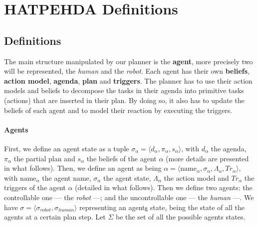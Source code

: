 \section{HATPEHDA Definitions}

\newcommand{\statespace}{S}
\newcommand{\worldstate}{s}
\newcommand{\agenth}{\alpha}
\newcommand{\agents}{Ag}
\newcommand{\agentstate}{\sigma}
\newcommand{\ctrlagents}{\widehat{Ag}}
\newcommand{\unctrlagents}{\widetilde{Ag}}
\newcommand{\agentsstates}{\sigma}
\newcommand{\ctrlagentsstates}{\widehat{\sigma}}
\newcommand{\unctrlagentsstates}{\widetilde{\sigma}}
\newcommand{\agentsstatesset}{\Sigma}
\newcommand{\actionmodel}{\Lambda}
\newcommand{\operators}{Op}
\newcommand{\abstracttasks}{Ab}
\newcommand{\methods}{Me}
\newcommand{\agenda}{d}
\newcommand{\plan}{\pi}
\newcommand{\triggerset}{Tr}
\newcommand{\policy}{\Pi}

\newcommand{\realset}{\mathbb{R}}
\newcommand{\intset}{\mathbb{N}}


\subsection{Definitions}
The main structure manipulated by our planner is the \textbf{agent}, more precisely two will be represented, the \textit{human} and the \textit{robot}. Each agent has their own \textbf{beliefs}, \textbf{action model}, \textbf{agenda}, \textbf{plan} and \textbf{triggers}. The planner has to use their action models and beliefs to decompose the tasks in their agenda into primitive tasks (actions) that are inserted in their plan. By doing so, it also has to update the beliefs of each agent and to model their reaction by executing the triggers.

\paragraph{\bf Agents}
First, we define an agent state as a tuple $\agentstate_{\agenth} = \langle  \agenda_{\agenth}, \plan_{\agenth}, \worldstate_{\agenth} \rangle$, with $\agenda_{\agenth}$ the agenda, $\plan_{\agenth}$ the partial plan and $\worldstate_{\agenth}$ the beliefs of the agent $\agenth$ (more details are presented in what follows). Then, we define an agent as being $\agenth = \langle \text{name}_{\agenth}, \agentstate_{\agenth}, \actionmodel_{\agenth}, \triggerset_{\agenth} \rangle$, with $\text{name}_{\agenth}$ the agent name, $\agentstate_{\agenth}$ the agent state, $\actionmodel_{\agenth}$ the action model and $\triggerset_{\agenth}$ the triggers of the agent $\agenth$ (detailed in what follows). Then we define two agents: the controllable one --- the \textit{robot} ---; and the uncontrollable one --- the \textit{human} ---. We have $\agentstate = \langle \agentstate_{robot}, \agentstate_{human} \rangle$ representing an agent\underline{s} state, being the state of all the agents at a certain plan step. Let $\agentsstatesset$ be the set of all the possible agents states.

